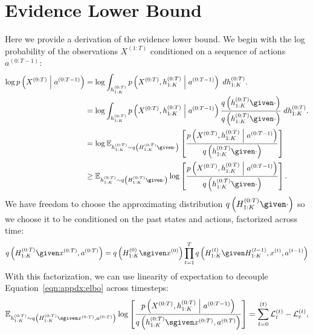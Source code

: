 \section{Evidence Lower Bound}  \label{appdx:problem_formulation} \label{appdx:elbo}
Here we provide a derivation of the evidence lower bound. We begin with the log probability of the observations $X^{(1:T)}$ conditioned on a sequence of actions $a^{(0:T-1)}$:
\footnotesize
\begin{align}
    \log p\left(X^{(0:T)} \;\middle|\; a^{(0:T-1)}\right) &= \log \int_{h_{1:K}^{(0:T)}} p\left(X^{(0:T)}, h^{(0:T)}_{1:K} \;\middle|\; a^{(0:T-1)}\right) \; dh_{1:K}^{(0:T)}.\nonumber\\
    &= \log \int_{h_{1:K}^{(0:T)}} p\left(X^{(0:T)}, h^{(0:T)}_{1:K} \;\middle|\; a^{(0:T-1)}\right) \frac{q\left(h^{(0:T)}_{1:K} \given \cdot \right)}{q\left(h^{(0:T)}_{1:K} \given \cdot \right)} \; dh_{1:K}^{(0:T)}.\nonumber\\
    &= \log \mathbb{E}_{h^{(0:T)}_{1:K} \sim q\left(H^{(0:T)}_{1:K} \given \cdot \right)} \left[\frac{p\left(X^{(0:T)}, h^{(0:T)}_{1:K} \;\middle|\; a^{(0:T-1)}\right)}{q\left(h^{(0:T)}_{1:K} \given \cdot \right)}\right]\nonumber\\
    &\geq \mathbb{E}_{h^{(0:T)}_{1:K} \sim q\left(H^{(0:T)}_{1:K} \given \cdot \right)} \log \left[\frac{p\left(X^{(0:T)}, h^{(0:T)}_{1:K} \;\middle|\; a^{(0:T-1)}\right)}{q\left(h^{(0:T)}_{1:K} \given \cdot \right)}\right]. \label{eqn:appdx:elbo}
\end{align}
\normalsize
We have freedom to choose the approximating distribution $q\left(H^{(0:T)}_{1:K} \given \cdot \right)$ so we choose it to be conditioned on the past states and actions, factorized across time:
\footnotesize
\begin{equation*}
    q\left(H^{(0:T)}_{1:K} \given x^{(0:T)}, a^{(0:T)}\right) = q\left(H^{(0)}_{1:K} \sgiven x^{(0)}\right) \prod_{t=1}^T q\left(H^{(t)}_{1:K} \given H^{(t-1)}_{1:K}, x^{(t)}, a^{(t-1)}\right)
\end{equation*}
\normalsize
With this factorization, we can use linearity of expectation to decouple Equation~\ref{eqn:appdx:elbo} across timesteps:
\footnotesize
\begin{equation*}
    \mathbb{E}_{h^{(0:T)}_{1:K} \sim q\left(H^{(0:T)}_{1:K} \sgiven x^{(0:T)}, a^{(0:T)}\right)} \log \left[\frac{p\left(X^{(0:T)}, h^{(0:T)}_{1:K} \;\middle|\; a^{(0:T-1)}\right)}{q\left(h^{(0:T)}_{1:K} \sgiven x^{(0:T)}, a^{(0:T)}\right)}\right] = \sum_{t=0}^{(t)} \mathcal{L}^{(t)}_{\text{r}} - \mathcal{L}^{(t)}_{\text{c}},
\end{equation*}
